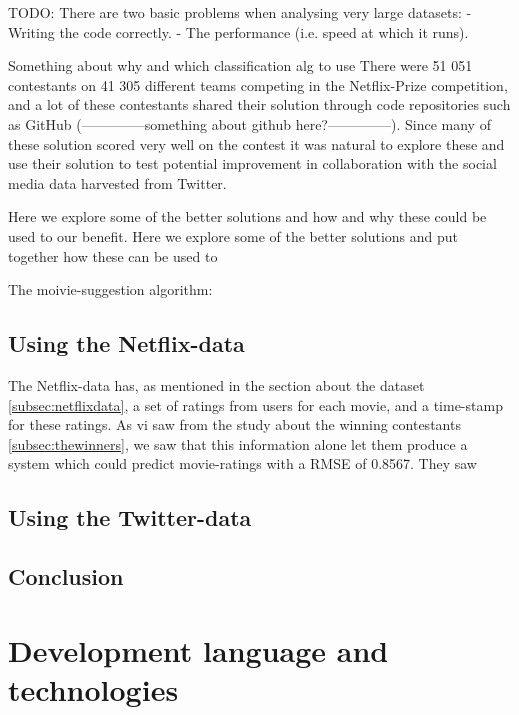 TODO:
There are two basic problems when analysing very large datasets:
    - Writing the code correctly.
    - The performance (i.e. speed at which it runs).



Something about why and which classification alg to use
There were 51 051 contestants on 41 305 different teams competing in the Netflix-Prize competition, and a lot of these contestants shared their solution through code repositories such as GitHub (--------------something about github here?--------------). Since many of these solution scored very well on the contest it was natural to explore these and use their solution to test potential improvement in collaboration with the social media data harvested from Twitter.

Here we explore some of the better solutions and how and why these could be used to our benefit.
Here we explore some of the better solutions and put together how these can be used to


The moivie-suggestion algorithm:


\subsection{Using the Netflix-data}
The Netflix-data has, as mentioned in the section about the dataset \ref{subsec:netflixdata}, a set of ratings from users for each movie, and a time-stamp for these ratings. As vi saw from the study about the winning contestants \ref{subsec:thewinners}, we saw that this information alone let them produce a system which could predict movie-ratings with a RMSE of 0.8567. They saw

\subsection{Using the Twitter-data}

\subsection{Conclusion}




\section{Development language and technologies}

